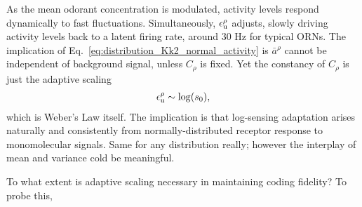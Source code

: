 As the mean odorant concentration is modulated, activity levels respond dynamically to fast fluctuations. Simultaneously, $\epsilon_{\text u}^\rho$ adjusts, slowly driving activity levels back to a latent firing rate, around 30 Hz for typical ORNs. The implication of Eq.~\ref{eq:distribution_Kk2_normal_activity} is $\bar a^\rho$ cannot be independent of background signal, unless $C_\rho$ is fixed. Yet the constancy of $C_\rho$ is just the adaptive scaling
\begin{align}
\epsilon_{\text u}^\rho \sim \log(s_0),
\end{align}
which is Weber's Law itself. The implication is that log-sensing adaptation arises naturally and consistently from normally-distributed receptor response to monomolecular signals. {\color {blue} Same for any distribution really; however the interplay of mean and variance cold be meaningful.}

To what extent is adaptive scaling necessary in maintaining coding fidelity? To probe this, 